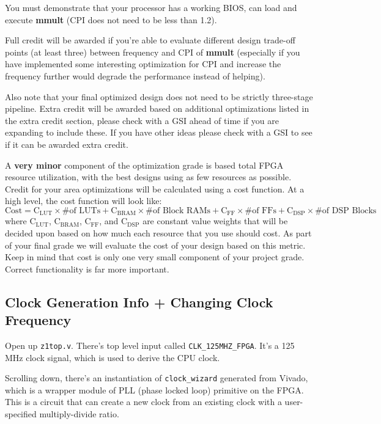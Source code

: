 \documentclass[11pt]{article}
\begin{document}
You must demonstrate that your processor has a working BIOS, can load and execute \textbf{mmult} (CPI does not need to be less than 1.2).

Full credit will be awarded if you're able to evaluate different design trade-off points (at least three) between frequency and CPI of \textbf{mmult} (especially if you have implemented some interesting optimization for CPI and increase the frequency further would degrade the performance instead of helping).

Also note that your final optimized design does not need to be strictly three-stage pipeline. Extra credit will be awarded based on additional optimizations listed in the extra credit section, please check with a GSI ahead of time if you are expanding to include these. If you have other ideas please check with a GSI to see if it can be awarded extra credit.

A \textbf{very minor} component of the optimization grade is based total FPGA resource utilization, with the best designs using as few resources as possible.
Credit for your area optimizations will be calculated using a cost function.
At a high level, the cost function will look like:
\begin{equation*}
\mathrm{Cost}=\mathrm{C_{LUT}} \times \text{\# of LUTs} + \mathrm{C_{BRAM}} \times \text{\# of Block RAMs} + \mathrm{C_{FF}} \times \text{\# of FFs} + \mathrm{C_{DSP}} \times \text{\# of DSP Blocks}
\end{equation*}
where $\mathrm{C_{LUT}}$, $\mathrm{C_{BRAM}}$, $\mathrm{C_{FF}}$, and $\mathrm{C_{DSP}}$ are constant value weights that will be decided upon based on how much each resource that you use should cost. As part of your final grade we will evaluate the cost of your design based on this metric. Keep in mind that cost is only one very small component of your project grade. Correct functionality is far more important.

\subsection{Clock Generation Info + Changing Clock Frequency}
Open up \verb|z1top.v|.
There's top level input called \verb|CLK_125MHZ_FPGA|.
It's a 125 MHz clock signal, which is used to derive the CPU clock.

Scrolling down, there's an instantiation of \verb|clock_wizard| generated from Vivado, which is a wrapper module of PLL (phase locked loop) primitive on the FPGA.
This is a circuit that can create a new clock from an existing clock with a user-specified multiply-divide ratio.
\end{document}
